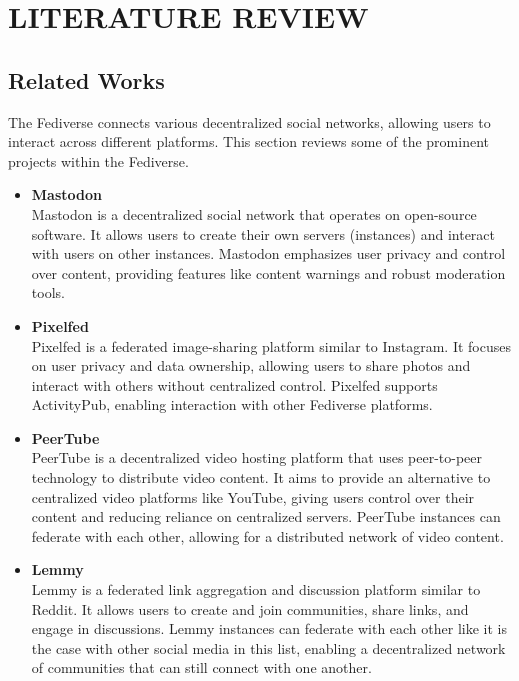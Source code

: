 \chapter{LITERATURE REVIEW}

\section{Related Works}

The Fediverse connects various decentralized social networks, allowing users to interact across different platforms. This section reviews some of the prominent projects within the Fediverse.

\begin{itemize}
  \item \textbf{Mastodon}\cite{mastodon}\\
    Mastodon is a decentralized social network that operates on open-source software. It allows users to create their own servers (instances) and interact with users on other instances. Mastodon emphasizes user privacy and control over content, providing features like content warnings and robust moderation tools.

  \item \textbf{Pixelfed}\cite{pixelfed}\\
    Pixelfed is a federated image-sharing platform similar to Instagram. It focuses on user privacy and data ownership, allowing users to share photos and interact with others without centralized control. Pixelfed supports ActivityPub, enabling interaction with other Fediverse platforms.

  \item \textbf{PeerTube}\cite{peertube}\\
    PeerTube is a decentralized video hosting platform that uses peer-to-peer technology to distribute video content. It aims to provide an alternative to centralized video platforms like YouTube, giving users control over their content and reducing reliance on centralized servers. PeerTube instances can federate with each other, allowing for a distributed network of video content.

  \item \textbf{Lemmy}\cite{lemmy}\\
    Lemmy is a federated link aggregation and discussion platform similar to Reddit. It allows users to create and join communities, share links, and engage in discussions. Lemmy instances can federate with each other like it is the case with other social media in this list, enabling a decentralized network of communities that can still connect with one another.


\end{itemize}
